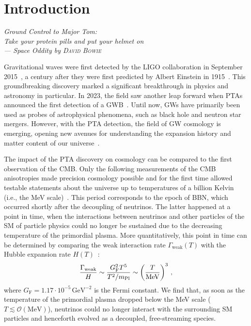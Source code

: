 

\chapter{Introduction}

\begin{flushright}
	\slshape
	Ground Control to Major Tom:\\
	Take your protein pills and put your helmet on\\ \medskip
	--- Space Oddity by \textsc{David Bowie}
\end{flushright}

Gravitational waves were first detected by the \acs{LIGO} collaboration in September 2015~\cite{LIGOScientific:2016aoc}, a century after they were first predicted by Albert Einstein in 1915~\cite{Einstein:1916cc}. This groundbreaking discovery marked a significant breakthrough in physics and astronomy in particular. In 2023, the field saw another leap forward when \acfp{PTA} announced the first detection of a \acf{GWB}~\cite{NANOGrav:2023gor, Reardon:2023gzh, EPTA:2023fyk, Xu:2023wog}.  Until now, \acp{GW} have primarily been used as probes of astrophysical phenomena, such as black hole and neutron star mergers. However, with the \ac{PTA} detection, the field of \ac{GW} cosmology is emerging, opening new avenues for understanding the expansion history and matter content of our universe~\cite{Caprini:2018mtu}.

The impact of the \ac{PTA} discovery on cosmology can be compared to the first observation of the \ac{CMB}. Only the following measurements of the \ac{CMB} anisotropies made precision cosmology possible and for the first time allowed testable statements about the universe up to temperatures of a billion Kelvin (i.e., the MeV scale)~\cite{Planck:2018vyg}. This period corresponds to the epoch of \ac{BBN}, which occurred shortly after the decoupling of neutrinos. The latter happened at a point in time, when the interactions between  neutrinos and other particles of the \ac{SM} of particle physics could no longer be sustained due to the decreasing temperature of the primordial plasma. More quantitatively, this point in time can be determined by comparing the weak interaction rate $\Gamma_\text{weak}(T)$ with the Hubble expansion rate $H(T)$~\cite{Baumann:2022mni}:
\begin{align}
	\frac{\Gamma_\text{weak}}{H} \sim \frac{G_\text{F}^2 T^5}{T^2 / m_\text{Pl}} \sim \left( \frac{T}{\text{MeV}} \right)^3 \, ,
\end{align}
where $G_\text{F} = 1.17 \cdot 10^{-5} \, \text{GeV}^{-2}$ is the Fermi constant. We find that, as soon as the temperature of the primordial plasma dropped below the MeV scale ($T \lesssim \mathcal{O}(\text{MeV})$), neutrinos could no longer interact with the surrounding \ac{SM} particles and henceforth evolved as a decoupled, free-streaming species.

